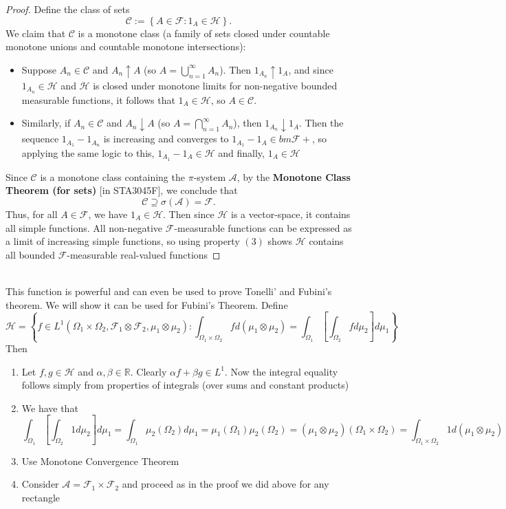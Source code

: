 \documentclass[11pt,a4paper]{article}
\theoremstyle{definition}
\begin{document}
\begin{proof}
Define the class of sets
\[
\mathcal{C} := \left\{ A \in \mathcal{F} : 1_A \in \mathcal{H} \right\}.
\]
We claim that $\mathcal{C}$ is a monotone class (a family of sets closed under countable monotone unions and countable monotone intersections):

\begin{itemize}
    \item Suppose $A_n \in \mathcal{C}$ and $A_n \uparrow A$ (so $A = \bigcup _{n=1}^{\infty} A_n$). Then $1_{A_n} \uparrow 1_A$, and since $1_{A_n} \in \mathcal{H}$ and $\mathcal{H}$ is closed under monotone limits for non-negative bounded measurable functions, it follows that $1_A \in \mathcal{H}$, so $A \in \mathcal{C}$.
    \item Similarly, if $A_n \in \mathcal{C}$ and $A_n \downarrow A$ (so $A = \bigcap _{n=1}^{\infty} A_n$), then $1_{A_n} \downarrow 1_A$. Then the sequence $1_{A_1} - 1_{A_n}$ is increasing and converges to $1_{A_1} - 1_{A} \in bm\mathcal{F}+$, so applying the same logic to this, $1_{A_1} - 1_{A} \in \mathcal{H}$ and finally, $1_{A} \in \mathcal{H}$
\end{itemize}
Since $\mathcal{C}$ is a monotone class containing the $\pi$-system $\mathcal{A}$, by the \textbf{Monotone Class Theorem (for sets)} [in STA3045F], we conclude that
\[
\mathcal{C} \supseteq \sigma(\mathcal{A}) = \mathcal{F}.
\]
Thus, for all $A \in \mathcal{F}$, we have $1_A \in \mathcal{H}$. Then since $\mathcal{H}$ is a vector-space, it contains all simple functions. All non-negative $\mathcal{F}$-measurable functions can be expressed as a limit of increasing simple functions, so using property $(3)$ shows $\mathcal{H}$ contains all bounded $\mathcal{F}$-measurable real-valued functions
\end{proof}
~\\ This function is powerful and can even be used to prove Tonelli' and Fubini's theorem. We will show it can be used for Fubini's Theorem. Define \[
\mathcal{H} = \left \{f \in L^1 (\Omega_1 \times \Omega_2, \mathcal{F}_1 \otimes \mathcal{F}_2, \mu _1 \otimes \mu _2): \int _{\Omega_1 \times \Omega_2} f d(\mu _1 \otimes \mu _2) = \int _{\Omega_1} \left [ \int _{\Omega_2} f d\mu _2 \right] d \mu_1 \right \}
\]
Then
\begin{enumerate}
\item Let $f,g \in \mathcal{H}$ and $\alpha, \beta \in \mathbb{R}$. Clearly $\alpha f + \beta g \in L^1$. Now the integral equality follows simply from properties of integrals (over sums and constant products)
\item We have that \[
\int _{\Omega_1} \left [ \int _{\Omega_2} 1 d\mu _2 \right] d \mu_1 = \int _{\Omega_1} \mu _2 (\Omega_2) d\mu _1 = \mu _1 (\Omega_1) \mu _2(\Omega_2) = (\mu _1 \otimes \mu_2) (\Omega_1 \times \Omega_2) = \int _{\Omega_1 \times \Omega_2} 1 d(\mu _1 \otimes \mu _2) 
\]
\item Use Monotone Convergence Theorem
\item Consider $\mathcal{A} = \mathcal{F}_1 \times \mathcal{F}_2$ and proceed as in the proof we did above for any rectangle
\end{enumerate}
\end{document}

